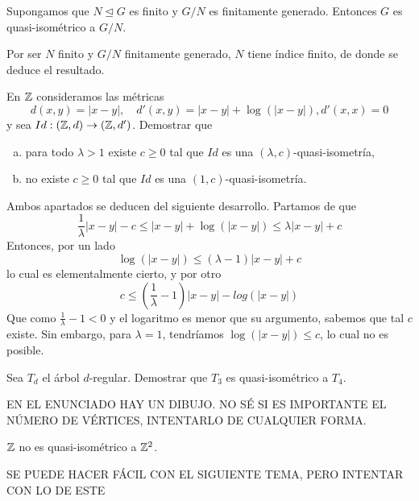 \documentclass[twoside]{article}
\begin{document}
\newpage

\begin{ejercicio}{1.2}
Supongamos que $N\trianglelefteq G$ es finito y $G/N$ es finitamente generado. Entonces $G$ es quasi-isométrico a $G/N$. 
\end{ejercicio}
\begin{solucion}
Por ser $N$ finito y $G/N$ finitamente generado, $N$ tiene índice finito, de donde se deduce el resultado. 

\end{solucion}




\newpage

\begin{ejercicio}{1.3}
En $\mathbb{Z}$ consideramos las métricas
\[
d(x,y)=|x-y|,\quad d'(x,y)=|x-y|+\log(|x-y|), d'(x,x)=0
\]
y sea $Id:(\mathbb{Z},d)\to(\mathbb{Z},d')$. Demostrar que
\begin{enumerate}[a)]
\item para todo $\lambda>1$ existe $c\geq 0$ tal que $Id$ es una $(\lambda,c)$-quasi-isometría,
\item no existe $c\geq 0$ tal que $Id$ es una $(1,c)$-quasi-isometría.
\end{enumerate}
\end{ejercicio}
\begin{solucion}
Ambos apartados se deducen del siguiente desarrollo. Partamos de que 
\[
\frac{1}{\lambda}|x-y|-c\leq |x-y|+\log(|x-y|)\leq \lambda|x-y|+c
\]
Entonces, por un lado
\[
\log(|x-y|)\leq (\lambda-1)|x-y|+c
\]
lo cual es elementalmente cierto, y por otro
\[
c\leq \left(\frac{1}{\lambda}-1\right)|x-y|-log(|x-y|)
\]
Que como $\frac{1}{\lambda}-1<0$ y el logaritmo es menor que su argumento, sabemos que tal $c$ existe. Sin embargo, para $\lambda=1$, tendríamos $\log(|x-y|)\leq c$, lo cual no es posible. 
\end{solucion}

\newpage

\begin{ejercicio}{1.4}
Sea $T_d$ el árbol $d$-regular. Demostrar que $T_3$ es quasi-isométrico a $T_4$.
\end{ejercicio}
\begin{solucion}
EN EL ENUNCIADO HAY UN DIBUJO. NO SÉ SI ES IMPORTANTE EL NÚMERO DE VÉRTICES, INTENTARLO DE CUALQUIER FORMA. 
\end{solucion}

\newpage

\begin{ejercicio}{1.5}
$\mathbb{Z}$ no es quasi-isométrico a $\mathbb{Z}^2$.
\end{ejercicio}
\begin{solucion}
SE PUEDE HACER FÁCIL CON EL SIGUIENTE TEMA, PERO INTENTAR CON LO DE ESTE
\end{solucion}
\end{document}

